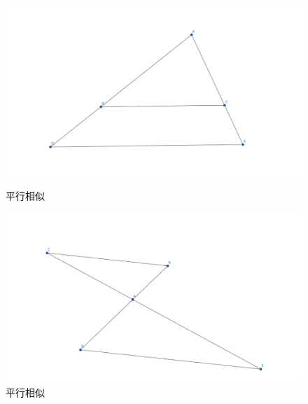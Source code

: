 \begin{figure}[H]
    \centering
    \hfill %
    \begin{minipage}[t]{0.45\textwidth}
    \centering
    \includegraphics[width=0.8\linewidth]{figures/平行相似.png}
    \caption{平行相似}
    \end{minipage}
    \hfill %
    \begin{minipage}[t]{0.45\textwidth}
    \centering
    \includegraphics[width=0.8\linewidth]{figures/平行相似2.png}
    \caption{平行相似}
    \end{minipage}
\end{figure}

